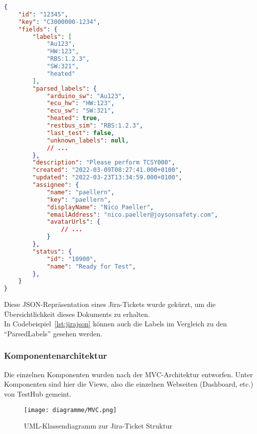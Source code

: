 \begin{lstlisting}[caption=gekürzte beispielhafte JSON Repräsentation eines Jira-Tickets,language=json,label={lst:jirajson}]
{
    "id": "12345",
    "key": "C3000000-1234",
    "fields": {
        "labels": [
            "Au123",
            "HW:123",
            "RBS:1.2.3",
            "SW:321",
            "heated"
        ],
        "parsed_labels": {
            "arduino_sw": "Au123",
            "ecu_hw": "HW:123",
            "ecu_sw": "SW:321",
            "heated": true,
            "restbus_sim": "RBS:1.2.3",
            "last_test": false,
            "unknown_labels": null,
            // ...
        },
        "description": "Please perform TCSY000",
        "created": "2022-03-09T08:27:41.000+0100",
        "updated": "2022-03-23T13:34:59.000+0100",
        "assignee": {
            "name": "paellern",
            "key": "paellern",
            "displayName": "Nico Paeller",
            "emailAddress": "nico.paeller@joysonsafety.com",
            "avatarUrls": {
                // ...
            }
        },
        "status": {
            "id": "10900",
            "name": "Ready for Test",
        },
    }
}
\end{lstlisting}

Diese \gls{JSON}-Repräsentation eines Jira-Tickets wurde gekürzt, um die Übersichtlichkeit
dieses Dokuments zu erhalten. \\

In Codebeispiel~\ref{lst:jirajson} können auch die Labels im Vergleich zu den
``ParsedLabels'' gesehen werden.

\subsubsection{Komponentenarchitektur}
Die einzelnen Komponenten wurden nach der \gls{MVC}-Architektur entworfen. Unter
Komponenten sind hier die Views, also die einzelnen Webseiten (Dashboard, etc.) 
von TestHub gemeint.

\begin{figure}[H]
    \texttt{[image: diagramme/MVC.png]}
    \caption{UML-Klassendiagramm zur Jira-Ticket Struktur}\label{fig:classes}
\end{figure}

